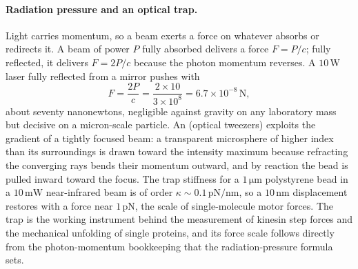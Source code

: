 

\paragraph{Radiation pressure and an optical trap.} Light carries momentum, so
a beam exerts a force on whatever absorbs or redirects it. A beam of power $P$
fully absorbed delivers a force $F = P/c$; fully reflected, it delivers
$F = 2P/c$ because the photon momentum reverses. A $10\,\si{\watt}$ laser
fully reflected from a mirror pushes with
\[
F = \frac{2P}{c} = \frac{2\times 10}{3\times 10^{8}}
= 6.7\times 10^{-8}\,\si{\newton},
\]
about seventy nanonewtons, negligible against gravity on any laboratory mass
but decisive on a micron-scale particle. An  (optical
tweezers) exploits the gradient of a tightly focused beam: a transparent
microsphere of higher index than its surroundings is drawn toward the intensity
maximum because refracting the converging rays bends their momentum outward, and
by reaction the bead is pulled inward toward the focus. The trap stiffness for a
$1\,\si{\micro\meter}$ polystyrene bead in a $10\,\si{\milli\watt}$
near-infrared beam is of order
$\kappa \sim 0.1\,\si{\pico\newton}/\si{\nano\meter}$, so a
$10\,\si{\nano\meter}$ displacement restores with a force near
$1\,\si{\pico\newton}$, the scale of single-molecule motor forces. The trap is
the working instrument behind the measurement of kinesin step forces and the
mechanical unfolding of single proteins, and its force scale follows directly
from the photon-momentum bookkeeping that the radiation-pressure formula sets.

